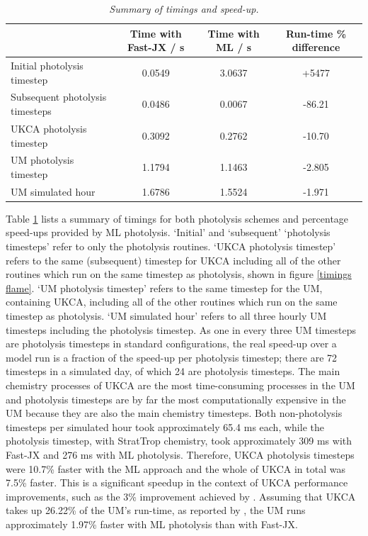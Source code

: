 \documentclass[journal abbreviation, manuscript]{copernicus}
\begin{document}
\begin{table}[htbp]
\centering
\caption{\textit{Summary of timings and speed-up.}}
\begin{tabular}{|lccc|}
\hline
 & Time with Fast-JX / s & Time with ML / s & Run-time \% difference \\
\hline
Initial photolysis timestep     & 0.0549 & 3.0637 & +5477 \\
Subsequent photolysis timesteps & 0.0486 & 0.0067 & -86.21 \\
UKCA photolysis timestep        & 0.3092 & 0.2762 & -10.70 \\
UM photolysis timestep          & 1.1794 & 1.1463 & -2.805 \\
UM simulated hour               & 1.6786 & 1.5524 & -1.971 \\
\hline
\end{tabular}
\label{timings table}
\end{table}

Table \ref{timings table} lists a summary of timings for both photolysis schemes and percentage speed-ups provided by ML photolysis. `Initial' and `subsequent' `photolysis timesteps' refer to only the photolysis routines. `UKCA photolysis timestep' refers to the same (subsequent) timestep for UKCA including all of the other routines which run on the same timestep as photolysis, shown in figure \ref{timings flame}. `UM photolysis timestep' refers to the same timestep for the UM, containing UKCA, including all of the other routines which run on the same timestep as photolysis. `UM simulated hour' refers to all three hourly UM timesteps including the photolysis timestep. As one in every three UM timesteps are photolysis timesteps in standard configurations, the real speed-up over a model run is a fraction of the speed-up per photolysis timestep; there are 72 timesteps in a simulated day, of which 24 are photolysis timesteps. The main chemistry processes of UKCA are the most time-consuming processes in the UM and photolysis timesteps are by far the most computationally expensive in the UM because they are also the main chemistry timesteps. Both non-photolysis timesteps per simulated hour took approximately 65.4 ms each, while the photolysis timestep, with StratTrop chemistry, took approximately 309 ms with Fast-JX and 276 ms with ML photolysis. Therefore, UKCA photolysis timesteps were 10.7\% faster with the ML approach and the whole of UKCA in total was 7.5\% faster. This is a significant speedup in the context of UKCA performance improvements, such as the 3\% improvement achieved by \cite{esenturk_quasi-newton_2018}. Assuming that UKCA takes up 26.22\% of the UM's run-time, as reported by \cite{dichev_report_2021}, the UM runs approximately 1.97\% faster with ML photolysis than with Fast-JX.
\end{document}
